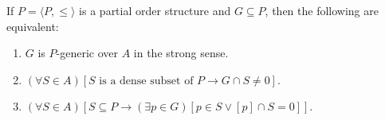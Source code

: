 If $P = \langle P, \leq \rangle$ is a partial order structure and $G \subseteq P$, then the following are equivalent:
\begin{enumerate}
\item $G$ is $P$-generic over $A$ in the strong sense.
\item $(\forall S \in A)[S \text{ is a dense subset of } P \rightarrow G \cap S \neq 0]$.
\item $(\forall S \in A)[S \subseteq P \rightarrow (\exists p \in G)[p \in S \lor [p] \cap S = 0]]$.
\end{enumerate}
